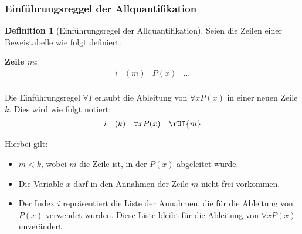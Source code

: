 \documentclass{book}
\theoremstyle{plain}
\theoremstyle{remark}
\theoremstyle{definition}
\newtheorem{definition}{Definition}[section]
\begin{document}
\subsubsection{Einführungsreggel der  Allquantifikation}
\label{rule:UI}
\begin{definition}[Einführungsregel der Allquantifikation]
Seien die Zeilen einer Beweistabelle wie folgt definiert:

\textbf{Zeile \(m\):}
\[
\begin{array}{llll}
    i & (m) & P(x) & \dots \\
\end{array}
\]

Die Einführungsregel \(\forall I\) erlaubt die Ableitung von \(\forall x P(x)\) in einer neuen Zeile \(k\). Dies wird wie folgt notiert:
\[
\begin{array}{llll}
    i & (k) & \forall x P(x) & \rUI{m} \\
\end{array}
\]

Hierbei gilt:
\begin{itemize}
    \item \(m < k\), wobei \(m\) die Zeile ist, in der \(P(x)\) abgeleitet wurde.
    \item Die Variable \(x\) darf in den Annahmen der Zeile \(m\) nicht frei vorkommen.
    \item Der Index \(i\) repräsentiert die Liste der Annahmen, die für die Ableitung von \(P(x)\) verwendet wurden. Diese Liste bleibt für die Ableitung von \(\forall x P(x)\) unverändert.
\end{itemize}
\end{definition}
\end{document}
